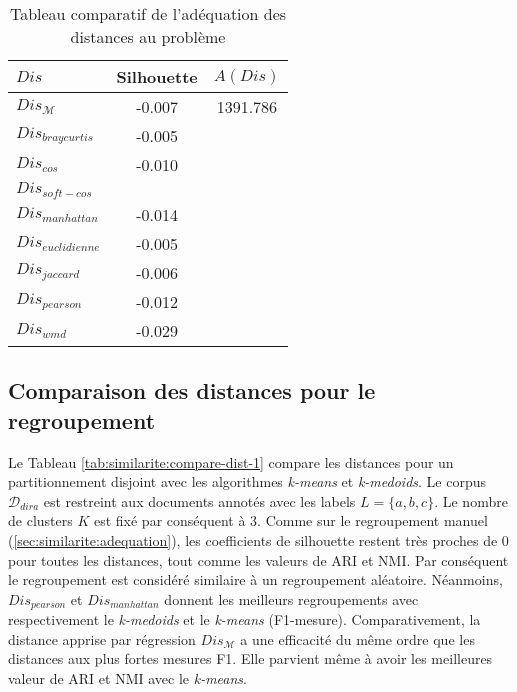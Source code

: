 \begin{table}[!htb]
	\centering \scriptsize
  \begin{tabular}{|l|c|c|}
  	\hline
	$Dis$ & Silhouette &  $A(Dis)$ \\ \hline
	$Dis_\mathcal{M}$ &-0.007& 1391.786 \\ \hline
	$Dis_{braycurtis}$ &-0.005& \\ \hline
	$Dis_{cos}$ &-0.010& \\ \hline
	$Dis_{soft-cos}$ && \\ \hline
	$Dis_{manhattan}$ &-0.014& \\ \hline
	$Dis_{euclidienne}$ &-0.005&  \\ \hline
	$Dis_{jaccard}$ &-0.006&  \\ \hline
	$Dis_{pearson}$ &-0.012& \\ \hline
	$Dis_{wmd}$ &-0.029& \\ \hline	
  \end{tabular}
	\caption{Tableau comparatif de l'adéquation des distances au problème} \label{tab:similarite:compare-dist-adequation}
\end{table}

\subsection{Comparaison des distances pour le regroupement}


Le Tableau \ref{tab:similarite:compare-dist-1} compare les distances pour un partitionnement disjoint avec les algorithmes \textit{k-means} et \textit{k-medoids}. Le corpus $\mathcal{D}_{dira}$ est restreint aux documents annotés avec les labels $L = \lbrace a, b, c \rbrace$. Le  nombre de clusters $K$ est fixé par conséquent à 3. Comme sur le regroupement manuel (\ref{sec:similarite:adequation}), les coefficients de silhouette restent très proches de 0 pour toutes les distances, tout comme les valeurs de ARI  et NMI. Par conséquent le regroupement est considéré similaire à un regroupement aléatoire. Néanmoins, $Dis_{pearson}$ et $Dis_{manhattan}$ donnent les meilleurs regroupements avec respectivement le \textit{k-medoids} et le \textit{k-means} (F1-mesure). Comparativement, la distance apprise par régression $Dis_\mathcal{M}$ a une efficacité du même ordre que les distances aux plus fortes mesures F1. Elle parvient même à avoir les meilleures valeur de ARI et NMI avec le \textit{k-means}.

